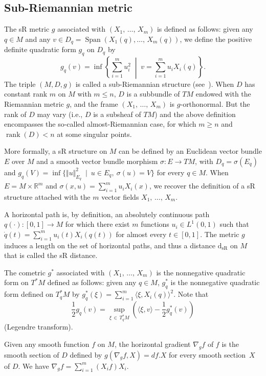 \documentclass[AHL,Unicode,published]{cedram}
\newcommand*\R{\mathbb{R}}
\DeclareMathOperator{\Span}{Span}
\DeclareMathOperator{\rank}{rank}
\newcommand{\dsR}{\mathrm{d}_{\mathrm{sR}}}
\renewcommand{\geq}{\geqslant}
\renewcommand{\leq}{\leqslant}
\begin{document}
\break

\subsection{Sub-Riemannian metric}
The sR metric $g$ associated with $(X_1,\,\ldots,\,X_m)$ is defined as follows: given any $q\in M$ and any $v\in D_q=\Span(X_1(q),\ldots,\,X_m(q))$, we define the positive definite quadratic form $g_q$ on $D_q$ by
\[
g_q(v) = \inf \left\{ \sum_{i=1}^m u_i^2 \; \middle| \; v=\sum_{i=1}^mu_iX_i(q) \right\}.
\]
The triple $(M,D,g)$ is called a sub-Riemannian structure (see~\cite{Bellaiche,Rifford_2014}). When $D$ has constant rank $m$ on $M$ with $m\leq n$, $D$ is a subbundle of $TM$ endowed with the Riemannian metric $g$, and the frame $(X_1,\,\ldots,\,X_m)$ is $g$-orthonormal. But the rank of $D$ may vary (i.e., $D$ is a subsheaf of $TM$) and the above definition encompasses the so-called almost-Riemannian case, for which $m\geq n$ and $\rank(D)<n$ at some singular points.

More formally, a sR structure on $M$ can be defined by an Euclidean vector bundle $E$ over $M$ and a smooth vector bundle morphism $\sigma:E\rightarrow TM$, with $D_q=\sigma(E_q)$ and $g_q(V)=\inf\{\Vert u\Vert_{E_q}^2\ \mid\ u\in E_q,\ \sigma(u)=V\}$ for every $q\in M$. When $E=M \times\R^m$ and $\sigma(x,u)=\sum_{i=1}^m u_i X_i(x)$, we recover the definition of a sR structure attached with the $m$ vector fields $X_1,\,\ldots,\,X_m$.

A horizontal path is, by definition, an absolutely continuous path $q(\cdot):[0,1]\rightarrow M$ for which there exist $m$ functions $u_i\in L^1(0,1)$ such that $\dot q(t) = \sum_{i=1}^m u_i(t)X_i(q(t))$ for almost every $t\in[0,1]$. The metric $g$ induces a length on the set of horizontal paths, and thus a distance $\dsR$ on $M$ that is called the sR distance.

The cometric $g^*$ associated with $(X_1,\,\ldots,\,X_m)$ is the nonnegative quadratic form on $T^*M$ defined as follows: given any $q\in M$, $g^*_q$ is the nonnegative quadratic form defined on $T_q^*M$ by $g^*_q(\xi)=\sum_{i=1}^m\langle\xi,X_i(q)\rangle^2$. Note that
\[
\frac{1}{2} g_q(v) = \sup_{\xi\,\in\,T^*_qM} \left(\langle\xi,v\rangle - \frac{1}{2}g^*_q(v) \right)
\]
(Legendre transform).

Given any smooth function $f$ on $M$, the horizontal gradient $\nabla_gf$ of $f$ is the smooth section of $D$ defined by $g(\nabla_gf,X)=df.X$ for every smooth section~$X$ of $D$. We have $\nabla_gf = \sum_{i=1}^m (X_if)X_i$.
\end{document}
